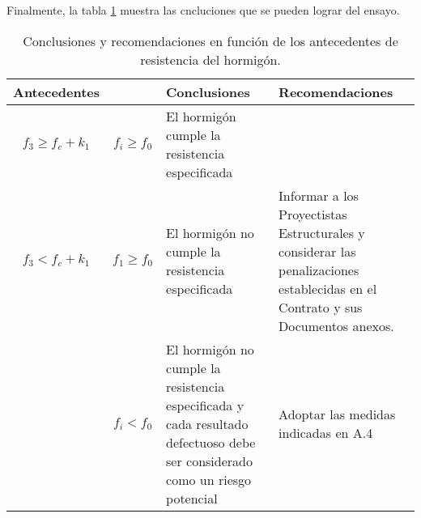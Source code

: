 Finalmente, la tabla \ref{tab:concluciones} muestra las cncluciones que se pueden lograr del ensayo.

\begin{table}[H]
\centering
\begin{tabular}{|c|c|p{6cm}|p{6cm}|}
\hline
\textbf{Antecedentes} &  & \textbf{Conclusiones} & \textbf{Recomendaciones} \\ \hline
$f_{3} \geq f_{c} + k_{1}$ & $f_{i} \geq f_{0}$ & 
El hormigón cumple la resistencia especificada & \\ \hline

$f_{3} < f_{c} + k_{1}$ & $f_{1} \geq f_{0}$ & 
El hormigón no cumple la resistencia especificada & 
Informar a los Proyectistas Estructurales y considerar las penalizaciones establecidas en el Contrato y sus Documentos anexos. \\ \hline

 & $f_{i} < f_{0}$ & 
El hormigón no cumple la resistencia especificada y cada resultado defectuoso debe ser considerado como un riesgo potencial & 
Adoptar las medidas indicadas en A.4 \\ \hline
\end{tabular}
\caption{Conclusiones y recomendaciones en función de los antecedentes de resistencia del hormigón.}
\label{tab:concluciones}
\end{table}

